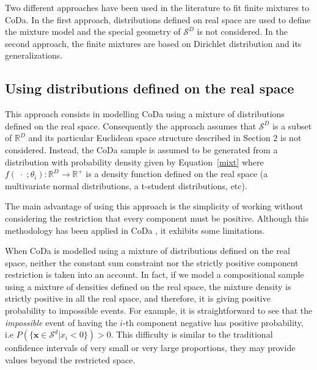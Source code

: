 \documentclass[10pt, a4paper]{article}
\begin{document}
\noindent Two different approaches have been used in the literature to fit finite mixtures to CoDa. 
In the first approach,  distributions defined on real space are used to define the mixture model and the special geometry of $\mathcal{S}^D$ is not considered. In the second approach,  the finite mixtures are based on Dirichlet distribution and its generalizations.


\subsection{Using distributions defined on the real space}
\label{real_section}

This approach consists in modelling CoDa using a mixture of distributions defined on the real space. Consequently the approach assumes that $\mathcal{S}^D$ is a subset of $\mathbb{R}^D$ and its particular Euclidean space structure described in Section 2 is not considered. Instead, the CoDa sample is assumed to be generated from a distribution with probability density given by Equation~\ref{mixt} where $f(\;\cdot\;;\theta_i): \mathbb{R}^D \rightarrow \mathbb{R}^+$ is a density function defined on the real space (a multivariate normal distributions, a  t-student distributions, etc).

The main advantage of using this approach is the simplicity of working without considering the restriction that every component must be positive.
Although this methodology has been applied in CoDa \citep[see][]{papageorgiou2001model}, it exhibits some limitations.


When CoDa is modelled using a mixture of distributions defined on the real space, neither the constant sum constraint nor the strictly positive component restriction is taken into an account. In fact, if we model a compositional sample using a mixture of densities defined on the real space, the mixture density is strictly positive in all the real space, and therefore, it is giving positive probability to impossible events. For example, it is straightforward to see that the \emph{impossible} event  of having the $i$-th component negative has positive probability, i.e $P(\{ \textbf{x} \in \mathcal{S}^d | x_i < 0 \}) > 0$. This difficulty is similar to the traditional confidence intervals of very small or very large proportions, they may provide values beyond the restricted space. 
\end{document}
